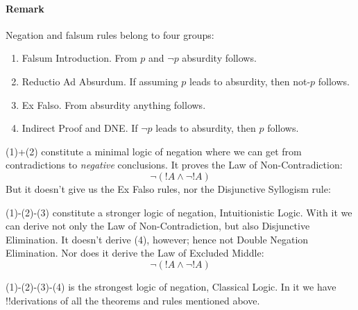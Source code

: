 \documentclass[../../../../include/open-logic-section]{subfiles}
\begin{document}
\paragraph{Remark} Negation and falsum rules belong to four groups:

\begin{enumerate}
\item Falsum Introduction. From $p$ and $\lnot p$ absurdity follows.
\item Reductio Ad Absurdum. If assuming $p$ leads to absurdity, then
not-$p$ follows.
\item Ex Falso. From absurdity anything follows.
\item Indirect Proof and DNE. If $\lnot p$ leads to absurdity, then
$p$ follows.
\end{enumerate}

(1)+(2) constitute a minimal logic of negation 
where we can get from contradictions to \emph{negative} conclusions.
It proves the Law of Non-Contradiction:
\begin{equation}\tag{Law of Non-Contradiction}
\lnot(!A\land\lnot!A)
\end{equation}
But it doesn't give us the Ex Falso rules, nor the Disjunctive Syllogism
rule:
\begin{prooftree}
\end{prooftree}

(1)-(2)-(3) constitute a stronger logic of negation, Intuitionistic Logic. 
With it we can derive not only the Law of Non-Contradiction, but 
also Disjunctive Elimination. It doesn't derive (4), 
however; hence not Double Negation Elimination. Nor does it derive
the Law of Excluded Middle: 
\begin{equation}\tag{Law of Excluded Middle}
    \lnot(!A\land\lnot!A)
\end{equation}

(1)-(2)-(3)-(4) is the strongest logic of negation, Classical Logic.
In it we have !!{derivation}s of all the theorems and rules mentioned
above.
\end{document}
